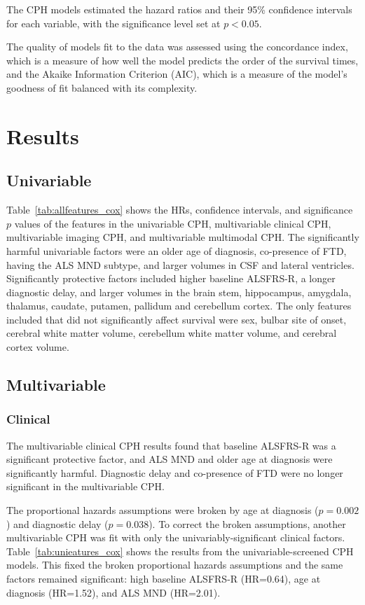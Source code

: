The CPH models estimated the hazard ratios and their 95\% confidence intervals for each variable, with the significance level set at $p<0.05$.

The quality of models fit to the data was assessed using the concordance index, which is a measure of how well the model predicts the order of the survival times, and the Akaike Information Criterion (AIC), which is a measure of the model's goodness of fit balanced with its complexity.

\section{Results}

\subsection{Univariable}



Table~\ref{tab:allfeatures_cox} shows the HRs, confidence intervals, and significance $p$ values of the features in the univariable CPH, multivariable clinical CPH, multivariable imaging CPH, and multivariable multimodal CPH.
The significantly harmful univariable factors were an older age of diagnosis, co-presence of FTD, having the ALS MND subtype, and larger volumes in CSF and lateral ventricles.
Significantly protective factors included higher baseline ALSFRS-R, a longer diagnostic delay, and larger volumes in the brain stem, hippocampus, amygdala, thalamus, caudate, putamen, pallidum and cerebellum cortex.
The only features included that did not significantly affect survival were sex, bulbar site of onset, cerebral white matter volume, cerebellum white matter volume, and cerebral cortex volume.


\subsection{Multivariable}

\subsubsection{Clinical}
The multivariable clinical CPH results found that baseline ALSFRS-R was a significant protective factor, and ALS MND and older age at diagnosis were significantly harmful.
Diagnostic delay and co-presence of FTD were no longer significant in the multivariable CPH.

The proportional hazards assumptions were broken by age at diagnosis ($p=0.002$) and diagnostic delay ($p=0.038$).
To correct the broken assumptions, another multivariable CPH was fit with only the univariably-significant clinical factors.
Table~\ref{tab:unieatures_cox} shows the results from the univariable-screened CPH models.
This fixed the broken proportional hazards assumptions and the same factors remained significant: high baseline ALSFRS-R (HR=0.64), age at diagnosis (HR=1.52), and ALS MND (HR=2.01).


